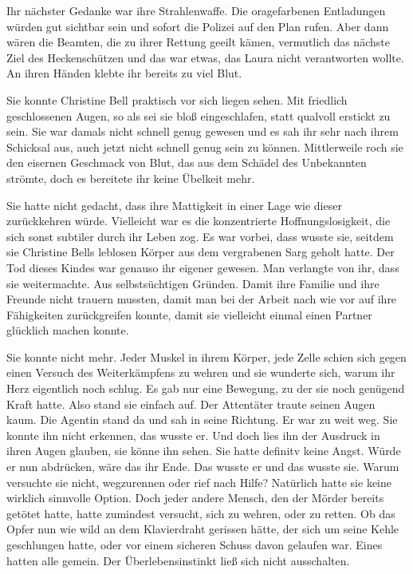 \par

Ihr nächster Gedanke war ihre Strahlenwaffe. Die oragefarbenen Entladungen würden gut sichtbar sein und sofort die Polizei auf den Plan rufen. Aber dann wären die Beamten, die zu ihrer Rettung geeilt kämen, vermutlich das nächste Ziel des Heckenschützen und das war etwas, das Laura nicht verantworten wollte. An ihren Händen klebte ihr bereits zu viel Blut.

\par

Sie konnte Christine Bell praktisch vor sich liegen sehen. Mit friedlich geschlossenen Augen, so als sei sie bloß eingeschlafen, statt qualvoll erstickt zu sein. Sie war damals nicht schnell genug gewesen und es sah ihr sehr nach ihrem Schicksal aus, auch jetzt nicht schnell genug sein zu können. Mittlerweile roch sie den eisernen Geschmack von Blut, das aus dem Schädel des Unbekannten strömte, doch es bereitete ihr keine Übelkeit mehr.

\par

Sie hatte nicht gedacht, dass ihre Mattigkeit in einer Lage wie dieser zurückkehren würde. Vielleicht war es die konzentrierte Hoffnungslosigkeit, die sich sonst subtiler durch ihr Leben zog. Es war vorbei, dass wusste sie, seitdem sie Christine Bells leblosen Körper aus dem vergrabenen Sarg geholt hatte. Der Tod dieses Kindes war genauso ihr eigener gewesen. Man verlangte von ihr, dass sie weitermachte. Aus selbstsüchtigen Gründen. Damit ihre Familie und ihre Freunde nicht trauern mussten, damit man bei der Arbeit nach wie vor auf ihre Fähigkeiten zurückgreifen konnte, damit sie vielleicht einmal einen Partner glücklich machen konnte.

\par

Sie konnte nicht mehr. Jeder Muskel in ihrem Körper, jede Zelle schien sich gegen einen Versuch des Weiterkämpfens zu wehren und sie wunderte sich, warum ihr Herz eigentlich noch schlug. Es gab nur eine Bewegung, zu der sie noch genügend Kraft hatte. Also stand sie einfach auf.
\ortswechsel
Der Attentäter traute seinen Augen kaum. Die Agentin stand da und sah in seine Richtung. Er war zu weit weg. Sie konnte ihn nicht erkennen, das wusste er. Und doch lies ihn der Ausdruck in ihren Augen glauben, sie könne ihn sehen. Sie hatte definitv keine Angst. Würde er nun abdrücken, wäre das ihr Ende. Das wusste er und das wusste sie. Warum versuchte sie nicht, wegzurennen oder rief nach Hilfe? Natürlich hatte sie keine wirklich sinnvolle Option. Doch jeder andere Mensch, den der Mörder bereits getötet hatte, hatte zumindest versucht, sich zu wehren, oder zu retten. Ob das Opfer nun wie wild an dem Klavierdraht gerissen hätte, der sich um seine Kehle geschlungen hatte, oder vor einem sicheren Schuss davon gelaufen war. Eines hatten alle gemein. Der Überlebensinstinkt ließ sich nicht ausschalten.

